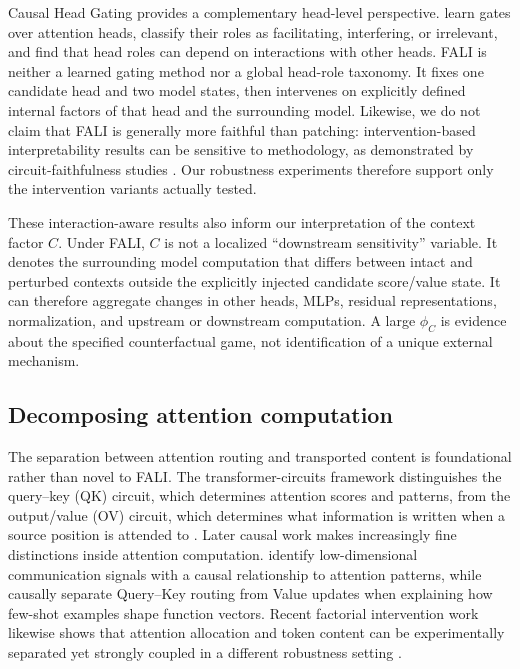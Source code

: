 \documentclass[pdflatex,sn-mathphys-ay]{sn-jnl}
\begin{document}
Causal Head Gating provides a complementary head-level perspective. \citet{nam2025causalhead} learn gates over attention heads, classify their roles as facilitating, interfering, or irrelevant, and find that head roles can depend on interactions with other heads. FALI is neither a learned gating method nor a global head-role taxonomy. It fixes one candidate head and two model states, then intervenes on explicitly defined internal factors of that head and the surrounding model. Likewise, we do not claim that FALI is generally more faithful than patching: intervention-based interpretability results can be sensitive to methodology, as demonstrated by circuit-faithfulness studies \citep{miller2024faithfulness}. Our robustness experiments therefore support only the intervention variants actually tested.

These interaction-aware results also inform our interpretation of the context factor $C$. Under FALI, $C$ is not a localized ``downstream sensitivity'' variable. It denotes the surrounding model computation that differs between intact and perturbed contexts outside the explicitly injected candidate score/value state. It can therefore aggregate changes in other heads, MLPs, residual representations, normalization, and upstream or downstream computation. A large $\phi_C$ is evidence about the specified counterfactual game, not identification of a unique external mechanism.

\subsection{Decomposing attention computation}\label{sec:rw-attention}

The separation between attention routing and transported content is foundational rather than novel to FALI. The transformer-circuits framework distinguishes the query--key (QK) circuit, which determines attention scores and patterns, from the output/value (OV) circuit, which determines what information is written when a source position is attended to \citep{elhage2021mathematical}. Later causal work makes increasingly fine distinctions inside attention computation. \citet{franco2025attentioncausal} identify low-dimensional communication signals with a causal relationship to attention patterns, while \citet{wang2026fewshot} causally separate Query--Key routing from Value updates when explaining how few-shot examples shape function vectors. Recent factorial intervention work likewise shows that attention allocation and token content can be experimentally separated yet strongly coupled in a different robustness setting \citep{zhu2026lexical}.
\end{document}
